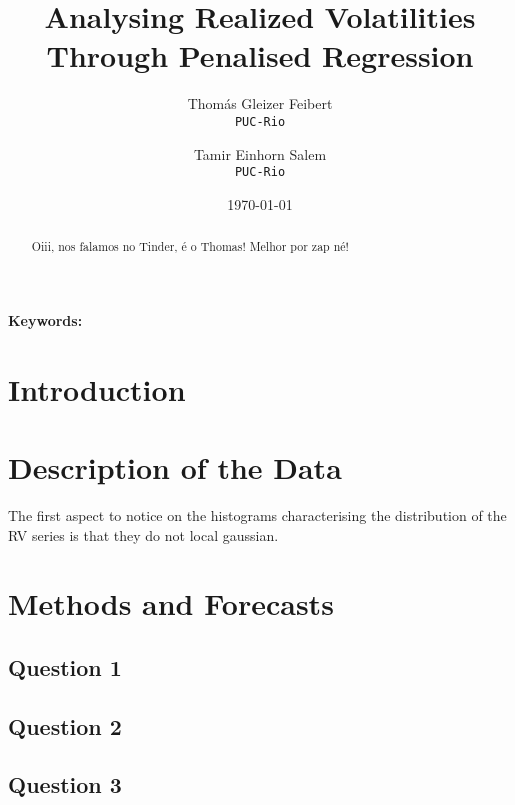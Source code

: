 \documentclass{article}
\title{Analysing Realized Volatilities Through Penalised Regression}
\author{Thomás Gleizer Feibert\\
  \texttt{PUC-Rio}
  \and
  Tamir Einhorn Salem
 \\
\texttt{PUC-Rio}\\
}
\date{\today}
\begin{document}
\maketitle

\begin{abstract}
Oiii, nos falamos no Tinder, é o Thomas! Melhor por zap né!
\end{abstract}

\textbf{Keywords:}

\newpage

\section{Introduction}


\section{Description of the Data}

The first aspect to notice on the histograms characterising the distribution of the RV series is that they do not local gaussian. 


\section{Methods and Forecasts}


\subsection{Question 1}

\subsection{Question 2}

\subsection{Question 3}
\end{document}
